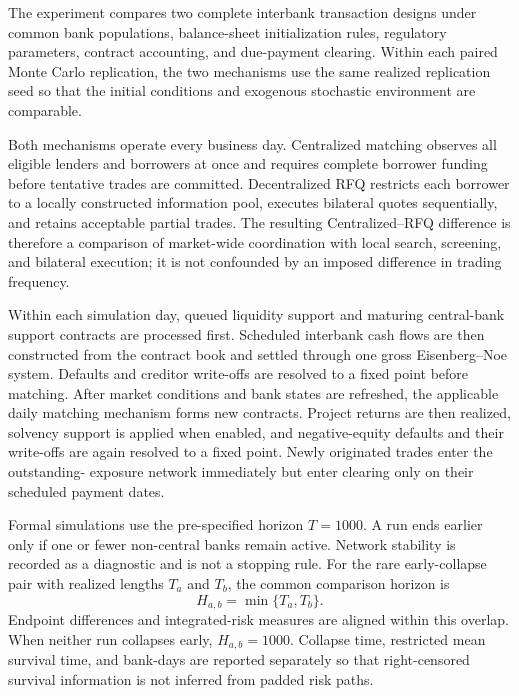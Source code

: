 The experiment compares two complete interbank transaction designs under
common bank populations, balance-sheet initialization rules, regulatory
parameters, contract accounting, and due-payment clearing. Within each
paired Monte Carlo replication, the two mechanisms use the same realized
replication seed so that the initial conditions and exogenous stochastic
environment are comparable.

Both mechanisms operate every business day. Centralized matching observes
all eligible lenders and borrowers at once and requires complete borrower
funding before tentative trades are committed. Decentralized RFQ restricts
each borrower to a locally constructed information pool, executes bilateral
quotes sequentially, and retains acceptable partial trades. The resulting
Centralized--RFQ difference is therefore a comparison of market-wide
coordination with local search, screening, and bilateral execution; it is
not confounded by an imposed difference in trading frequency.

Within each simulation day, queued liquidity support and maturing
central-bank support contracts are processed first. Scheduled interbank
cash flows are then constructed from the contract book and settled through
one gross Eisenberg--Noe system. Defaults and creditor write-offs are
resolved to a fixed point before matching. After market conditions and bank
states are refreshed, the applicable daily matching mechanism forms new
contracts. Project returns are then realized, solvency support is applied
when enabled, and negative-equity defaults and their write-offs are again
resolved to a fixed point. Newly originated trades enter the outstanding-
exposure network immediately but enter clearing only on their scheduled
payment dates.

Formal simulations use the pre-specified horizon \(T=1000\). A run ends
earlier only if one or fewer non-central banks remain active. Network
stability is recorded as a diagnostic and is not a stopping rule. For the
rare early-collapse pair with realized lengths \(T_a\) and \(T_b\), the
common comparison horizon is
\begin{equation}
H_{a,b}=\min\{T_a,T_b\}.
\label{eq:common-horizon}
\end{equation}
Endpoint differences and integrated-risk measures are aligned within this
overlap. When neither run collapses early, \(H_{a,b}=1000\). Collapse time,
restricted mean survival time, and bank-days are reported separately so
that right-censored survival information is not inferred from padded risk
paths.

